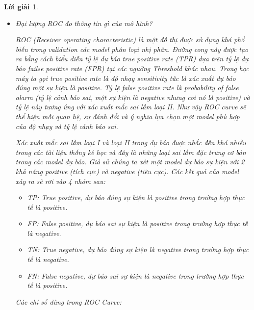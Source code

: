 \documentclass[14pt, a4paper]{article}
\theoremstyle{sltheorem}
\theoremstyle{soltheorem}
\newtheorem*{loigiai}{Lời giải}
\begin{document}
\begin{loigiai}
    \begin{itemize}
        \item Đại lượng ROC đo thông tin gì của mô hình?
        
        ROC (Receiver operating characteristic) là một đồ thị được sử dụng khá phổ biến trong validation các model phân loại nhị phân. Đường cong này được tạo ra bằng cách biểu diễn tỷ lệ dự báo true positive rate (TPR) dựa trên tỷ lệ dự báo failse positive rate (FPR) tại các ngưỡng Threshold khác nhau. 
        Trong học máy ta gọi true positive rate là độ nhạy sensitivity tức là xác xuất dự báo đúng một sự kiện là positive. Tỷ lệ false positive rate là probability of false alarm (tỷ lệ cảnh báo sai, một sự kiện là negative nhưng coi nó là positive) và tỷ lệ này tương ứng với xác xuất mắc sai lầm loại II. Như vậy ROC curve sẽ thể hiện mối quan hệ, sự đánh đổi và ý nghĩa lựa chọn một model phù hợp của độ nhạy và tỷ lệ cảnh báo sai.

        Xác xuất mắc sai lầm loại I và loại II trong dự báo được nhắc đến khá nhiều trong các tài liệu thống kê học và đây là những loại sai lầm đặc trưng cơ bản trong các model dự báo. Giả sử chúng ta xét một model dự báo sự kiện với 2 khả năng positive (tích cực) và negative (tiêu cực). Các kết quả của model xảy ra sẽ rơi vào 4 nhóm sau:

        \begin{itemize}
            \item TP: True positive, dự báo đúng sự kiện là positive trong trường hợp thực tế là positive.
            \item FP: False positive, dự báo sai sự kiện là positive trong trường hợp thực tế là negative.
            \item TN: True negative, dự báo đúng sự kiện là negative trong trường hợp thực tế là negative.
            \item FN: False negative, dự báo sai sự kiện là negative trong trường hợp thực tế là positive.
        \end{itemize}

        Các chỉ số dùng trong ROC Curve:


\end{itemize}
\end{loigiai}
\end{document}
